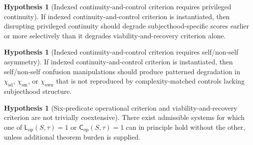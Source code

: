 \documentclass[11pt,a4paper]{article}
\theoremstyle{definition}
\newtheorem{hypothesis}[proposition]{Hypothesis}
\newcommand{\Cop}{\mathsf{C}_{\mathrm{op}}}
\newcommand{\Lop}{\mathsf{L}_{\mathrm{op}}}
\newcommand{\SelfDisc}{\chi_{\mathrm{sd}}}
\newcommand{\SelfModel}{\chi_{\mathrm{sm}}}
\newcommand{\Own}{\chi_{\mathrm{own}}}
\begin{document}
\begin{hypothesis}[Indexed continuity-and-control criterion requires privileged continuity]\label{hyp:subject-pc}
If indexed continuity-and-control criterion is instantiated, then disrupting privileged continuity should degrade subjecthood-specific scores earlier or more selectively than it degrades viability-and-recovery criterion alone.
\end{hypothesis}

\begin{hypothesis}[Indexed continuity-and-control criterion requires self/non-self asymmetry]\label{hyp:selfnonself}
If indexed continuity-and-control criterion is instantiated, then self/non-self confusion manipulations should produce patterned degradation in $\SelfDisc$, $\SelfModel$, or $\Own$ that is not reproduced by complexity-matched controls lacking subjecthood structure.
\end{hypothesis}

\begin{hypothesis}[Six-predicate operational criterion and viability-and-recovery criterion are not trivially coextensive]\label{hyp:noncollapse}
There exist admissible systems for which one of $\Lop(S,\tau)=1$ or $\Cop(S,\tau)=1$ can in principle hold without the other, unless additional theorem burden is supplied.
\end{hypothesis}
\end{document}
